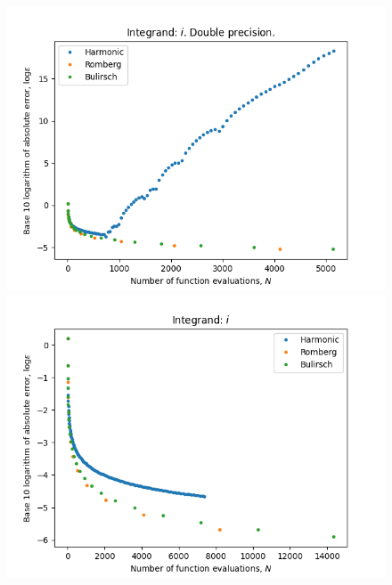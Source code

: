 \begin{figure}[H]
\centering
\begin{minipage}{0.45\textwidth}
\centering
\includegraphics[scale=0.45]{../results/romberg_plots/circle_area.png}
\end{minipage}
\begin{minipage}{0.45\textwidth}
\centering
\includegraphics[scale=0.45]{../results/romberg_plots/circle_area_hp.png}
\end{minipage}
\end{figure}

